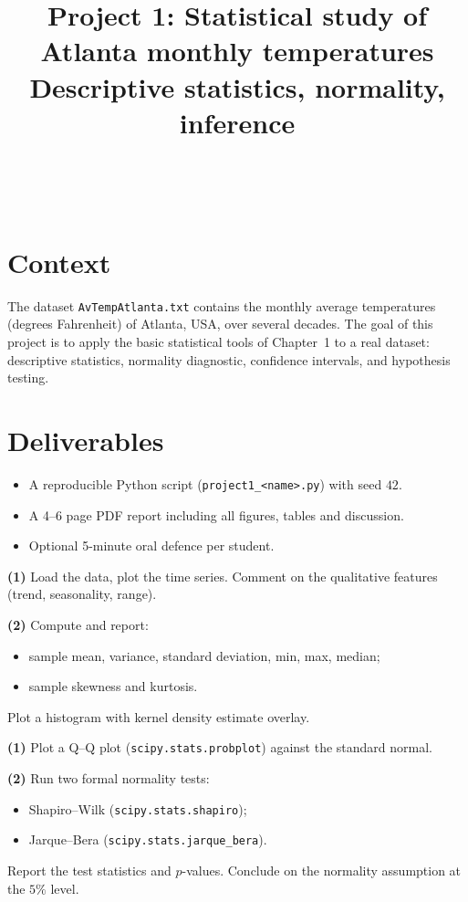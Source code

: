 \documentclass[a4paper,11pt]{article}
\title{Project 1: Statistical study of Atlanta monthly temperatures\\
\large Descriptive statistics, normality, inference}
\author{\auteurNom\\\auteurEmail\\\auteurInstitution}
\date{\anneeUniversitaire}
\begin{document}
\maketitle

\section*{Context}

The dataset \texttt{AvTempAtlanta.txt} contains the monthly average
temperatures (degrees Fahrenheit) of Atlanta, USA, over several
decades. The goal of this project is to apply the basic statistical
tools of Chapter~1 to a real dataset: descriptive statistics, normality
diagnostic, confidence intervals, and hypothesis testing.

\section*{Deliverables}
\begin{itemize}
  \item A reproducible Python script (\texttt{project1\_<name>.py})
        with seed $42$.
  \item A 4--6 page PDF report including all figures, tables and
        discussion.
  \item Optional 5-minute oral defence per student.
\end{itemize}

\begin{exercise}
\textbf{(1)} Load the data, plot the time series. Comment on the
qualitative features (trend, seasonality, range).

\textbf{(2)} Compute and report:
\begin{itemize}
  \item sample mean, variance, standard deviation, min, max, median;
  \item sample skewness and kurtosis.
\end{itemize}
Plot a histogram with kernel density estimate overlay.
\end{exercise}

\begin{exercise}
\textbf{(1)} Plot a Q--Q plot (\texttt{scipy.stats.probplot}) against
the standard normal.

\textbf{(2)} Run two formal normality tests:
\begin{itemize}
  \item Shapiro--Wilk (\texttt{scipy.stats.shapiro});
  \item Jarque--Bera (\texttt{scipy.stats.jarque\_bera}).
\end{itemize}
Report the test statistics and $p$-values. Conclude on the normality
assumption at the $5\%$ level.
\end{exercise}
\end{document}
